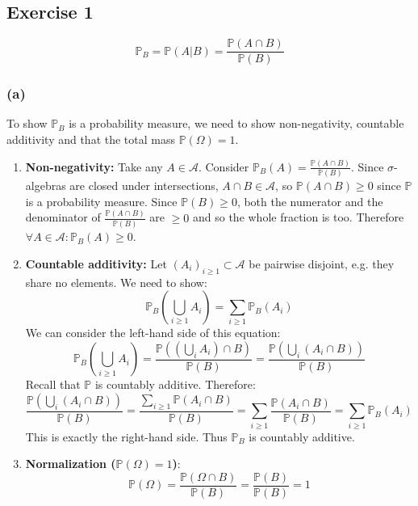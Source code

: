 \documentclass{article}
\begin{document}
\subsection*{Exercise 1}
\[
    \mathbb{P}_B = \mathbb{P}(A|B) = \frac{\mathbb{P}(A \cap B)}{\mathbb{P}(B)}
\]

\subsubsection*{(a)}

To show $\mathbb{P}_B$ is a probability measure, we need to show non-negativity, countable additivity and that the total mass $\mathbb{P}(\Omega) = 1$.

\begin{enumerate}
    \item \textbf{Non-negativity:} Take any $A \in \mathcal{A}$. Consider $\mathbb{P}_B (A) = \frac{\mathbb{P}(A \cap B)}{\mathbb{P}(B)}$. Since $\sigma$-algebras are closed under intersections, $A \cap B \in \mathcal{A}$, so $\mathbb{P}(A\cap B) \geq 0$ since $\mathbb{P}$ is a probability measure. Since $\mathbb{P}(B) \geq 0$, both the numerator and the denominator of $\frac{\mathbb{P}(A \cap B)}{\mathbb{P}(B)}$ are $\geq 0$ and so the whole fraction is too. Therefore $\forall A \in \mathcal{A}: \mathbb{P}_B (A) \geq 0$.

    \item \textbf{Countable additivity:} Let $(A_i)_{i \geq 1} \subset \mathcal{A}$ be pairwise disjoint, e.g. they share no elements. We need to show:
    \[
        \mathbb{P}_B (\bigcup_{i \geq 1} A_i) = \sum_{i \geq 1} \mathbb{P}_B (A_i)
    \]
    We can consider the left-hand side of this equation:
    \[
        \mathbb{P}_B (\bigcup_{i \geq 1} A_i) = \frac{\mathbb{P}((\bigcup_i A_i) \cap B)}{\mathbb{P}(B)} = \frac{\mathbb{P}(\bigcup_i (A_i \cap B))}{\mathbb{P}(B)}
    \]
    Recall that $\mathbb{P}$ is countably additive. Therefore:
    \[
        \frac{\mathbb{P}(\bigcup_i (A_i \cap B))}{\mathbb{P}(B)} = \frac{\sum_{i \geq 1} \mathbb{P}(A_i \cap B)}{\mathbb{P}(B)} = \sum_{i \geq 1} \frac{\mathbb{P}(A_i \cap B)}{\mathbb{P}(B)} = \sum_{i \geq 1} \mathbb{P}_B (A_i)
    \]
    This is exactly the right-hand side. Thus $\mathbb{P}_B$ is countably additive.

    \item \textbf{Normalization ($\mathbb{P}(\Omega) = 1$)}:
    \[
        \mathbb{P}(\Omega) = \frac{\mathbb{P}(\Omega \cap B)}{\mathbb{P}(B)} = \frac{\mathbb{P}(B)}{\mathbb{P}(B)} = 1
    \]

\end{enumerate}
\end{document}
